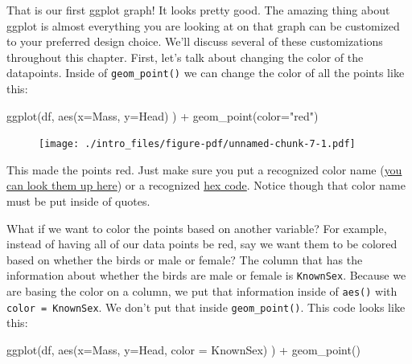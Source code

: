 \documentclass[
  letterpaper,
  DIV=11,
  numbers=noendperiod]{scrreprt}
\newenvironment{Shaded}{\begin{snugshade}}{\end{snugshade}}
\newcommand{\AttributeTok}[1]{\textcolor[rgb]{0.40,0.45,0.13}{#1}}
\newcommand{\FunctionTok}[1]{\textcolor[rgb]{0.28,0.35,0.67}{#1}}
\newcommand{\NormalTok}[1]{\textcolor[rgb]{0.00,0.23,0.31}{#1}}
\newcommand{\SpecialCharTok}[1]{\textcolor[rgb]{0.37,0.37,0.37}{#1}}
\newcommand{\StringTok}[1]{\textcolor[rgb]{0.13,0.47,0.30}{#1}}
\begin{document}
That is our first ggplot graph! It looks pretty good. The amazing thing
about ggplot is almost everything you are looking at on that graph can
be customized to your preferred design choice. We'll discuss several of
these customizations throughout this chapter. First, let's talk about
changing the color of the datapoints. Inside of \texttt{geom\_point()}
we can change the color of all the points like this:

\begin{Shaded}
\begin{Highlighting}[]
\FunctionTok{ggplot}\NormalTok{(df, }\FunctionTok{aes}\NormalTok{(}\AttributeTok{x=}\NormalTok{Mass, }\AttributeTok{y=}\NormalTok{Head) ) }\SpecialCharTok{+} \FunctionTok{geom\_point}\NormalTok{(}\AttributeTok{color=}\StringTok{"red"}\NormalTok{)}
\end{Highlighting}
\end{Shaded}

\begin{figure}[H]

{\centering \texttt{[image: ./intro\_files/figure-pdf/unnamed-chunk-7-1.pdf]}

}

\end{figure}

This made the points red. Just make sure you put a recognized color name
(\href{http://www.stat.columbia.edu/~tzheng/files/Rcolor.pdf}{you can
look them up here}) or a recognized
\href{https://htmlcolorcodes.com/color-picker/}{hex code}. Notice though
that color name must be put inside of quotes.

What if we want to color the points based on another variable? For
example, instead of having all of our data points be red, say we want
them to be colored based on whether the birds or male or female? The
column that has the information about whether the birds are male or
female is \texttt{KnownSex}. Because we are basing the color on a
column, we put that information inside of \texttt{aes()} with
\texttt{color\ =\ KnownSex}. We don't put that inside
\texttt{geom\_point()}. This code looks like this:

\begin{Shaded}
\begin{Highlighting}[]
\FunctionTok{ggplot}\NormalTok{(df, }\FunctionTok{aes}\NormalTok{(}\AttributeTok{x=}\NormalTok{Mass, }\AttributeTok{y=}\NormalTok{Head, }\AttributeTok{color =}\NormalTok{ KnownSex) ) }\SpecialCharTok{+} \FunctionTok{geom\_point}\NormalTok{() }
\end{Highlighting}
\end{Shaded}
\end{document}
